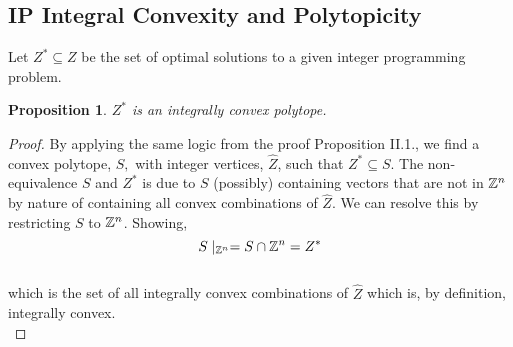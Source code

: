 \documentclass[conference]{IEEEtran}
\numberwithin{equation}{section}
\numberwithin{figure}{section}
\theoremstyle{plain}
\newtheorem{prop}[equation]{Proposition}
\theoremstyle{definition}
\newcommand{\Z}{\ensuremath \mathbb{Z}}
\newcommand{\1}{\ensuremath \mathbbm{1}}
\begin{document}
\subsection{IP Integral Convexity and Polytopicity}
Let $Z^* \subseteq Z$ be the set of optimal solutions to a given integer 
programming problem. \\
\begin{prop}
$Z^*$ is an integrally convex polytope. \\
\end{prop}
\begin{proof}
By applying the same logic from the proof Proposition II.1., we find a convex 
polytope, $S,$ with integer vertices, $\hat{Z}$, such that $Z^* \subseteq S$. 
The non-equivalence $S$ and $Z^*$ is due to $S$ (possibly) containing vectors 
that are not in $\Z^n$ by nature of containing all convex combinations of 
$\hat{Z}$. We can resolve this by restricting $S$ to $\Z^n$. Showing, \\ 
\[S\mid_{\Z^n} = S \cap \Z^n = Z^*\] \\
which is the set of all integrally convex combinations of $\hat{Z}$ which is, by 
definition, integrally convex. \\
\end{proof}
\end{document}
